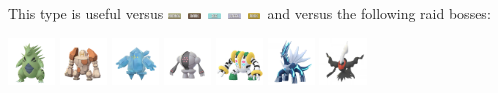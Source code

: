 \documentclass[8pt,aspectratio=169,compress]{beamer}
\newcommand{\darkfull}{\includegraphics[height=0.15cm]{../../images/type/full/Dark.png}}
\newcommand{\icefull}{\includegraphics[height=0.15cm]{../../images/type/full/Ice.png}}
\newcommand{\normalfull}{\includegraphics[height=0.15cm]{../../images/type/full/Normal.png}}
\newcommand{\rockfull}{\includegraphics[height=0.15cm]{../../images/type/full/Rock.png}}
\newcommand{\steelfull}{\includegraphics[height=0.15cm]{../../images/type/full/Steel.png}}
\begin{document}
\begin{frame}
\begin{tiny}
\begin{block}{}\begin{center}
This type is useful versus \normalfull~\darkfull~\icefull~\steelfull~\rockfull~and versus the following raid bosses:

    \includegraphics[width=1.25cm]{../../images/pokemon/tyranitar.png}
    \includegraphics[width=1.25cm]{../../images/pokemon/regirock.png}
    \includegraphics[width=1.25cm]{../../images/pokemon/regice.png}
    \includegraphics[width=1.25cm]{../../images/pokemon/registeel.png}
    \includegraphics[width=1.25cm]{../../images/pokemon/regigigas.png}
    \includegraphics[width=1.25cm]{../../images/pokemon/dialga.png}
    \includegraphics[width=1.25cm]{../../images/pokemon/darkrai.png}
\end{center}
\end{block}
\end{tiny}
\end{frame}

\end{document}
